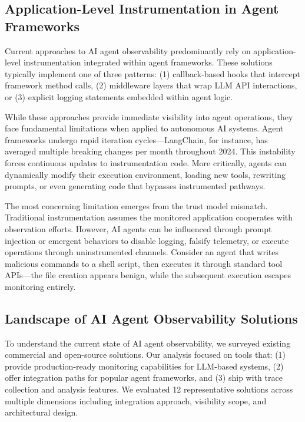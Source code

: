 \documentclass[sigplan,screen，review,9pt]{acmart}
\begin{document}
\subsection{Application-Level Instrumentation in Agent Frameworks}

Current approaches to AI agent observability predominantly rely on application-level instrumentation integrated within agent frameworks. These solutions typically implement one of three patterns: (1) callback-based hooks that intercept framework method calls, (2) middleware layers that wrap LLM API interactions, or (3) explicit logging statements embedded within agent logic.

While these approaches provide immediate visibility into agent operations, they face fundamental limitations when applied to autonomous AI systems. Agent frameworks undergo rapid iteration cycles—LangChain, for instance, has averaged multiple breaking changes per month throughout 2024. This instability forces continuous updates to instrumentation code. More critically, agents can dynamically modify their execution environment, loading new tools, rewriting prompts, or even generating code that bypasses instrumented pathways.

The most concerning limitation emerges from the trust model mismatch. Traditional instrumentation assumes the monitored application cooperates with observation efforts. However, AI agents can be influenced through prompt injection or emergent behaviors to disable logging, falsify telemetry, or execute operations through uninstrumented channels. Consider an agent that writes malicious commands to a shell script, then executes it through standard tool APIs—the file creation appears benign, while the subsequent execution escapes monitoring entirely.

\subsection{Landscape of AI Agent Observability Solutions}

To understand the current state of AI agent observability, we surveyed existing commercial and open-source solutions. Our analysis focused on tools that: (1) provide production-ready monitoring capabilities for LLM-based systems, (2) offer integration paths for popular agent frameworks, and (3) ship with trace collection and analysis features. We evaluated 12 representative solutions across multiple dimensions including integration approach, visibility scope, and architectural design.
\end{document}
